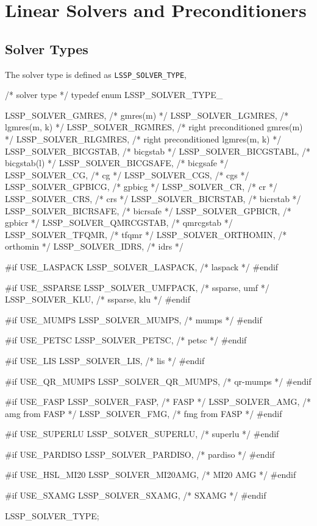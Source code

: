 \chapter{Linear Solvers and Preconditioners}

\section{Solver Types}
The solver type is defined as \verb|LSSP_SOLVER_TYPE|,

\begin{evb}
/* solver type */
typedef enum LSSP_SOLVER_TYPE_
{
    LSSP_SOLVER_GMRES,     /* gmres(m) */
    LSSP_SOLVER_LGMRES,    /* lgmres(m, k) */
    LSSP_SOLVER_RGMRES,    /* right preconditioned gmres(m) */
    LSSP_SOLVER_RLGMRES,   /* right preconditioned lgmres(m, k) */
    LSSP_SOLVER_BICGSTAB,  /* bicgstab */
    LSSP_SOLVER_BICGSTABL, /* bicgstab(l) */
    LSSP_SOLVER_BICGSAFE,  /* bicgsafe */
    LSSP_SOLVER_CG,        /* cg */
    LSSP_SOLVER_CGS,       /* cgs */
    LSSP_SOLVER_GPBICG,    /* gpbicg */
    LSSP_SOLVER_CR,        /* cr */
    LSSP_SOLVER_CRS,       /* crs */
    LSSP_SOLVER_BICRSTAB,  /* bicrstab */
    LSSP_SOLVER_BICRSAFE,  /* bicrsafe */
    LSSP_SOLVER_GPBICR,    /* gpbicr */
    LSSP_SOLVER_QMRCGSTAB, /* qmrcgstab */
    LSSP_SOLVER_TFQMR,     /* tfqmr */
    LSSP_SOLVER_ORTHOMIN,  /* orthomin */
    LSSP_SOLVER_IDRS,      /* idrs */

#if USE_LASPACK
    LSSP_SOLVER_LASPACK,   /* laspack */
#endif

#if USE_SSPARSE
    LSSP_SOLVER_UMFPACK,   /* ssparse, umf */
    LSSP_SOLVER_KLU,       /* ssparse, klu */
#endif

#if USE_MUMPS
    LSSP_SOLVER_MUMPS,     /* mumps */
#endif

#if USE_PETSC
    LSSP_SOLVER_PETSC,     /* petsc */
#endif

#if USE_LIS
    LSSP_SOLVER_LIS,       /* lis */
#endif

#if USE_QR_MUMPS
    LSSP_SOLVER_QR_MUMPS,  /* qr-mumps */
#endif

#if USE_FASP
    LSSP_SOLVER_FASP,      /* FASP */
    LSSP_SOLVER_AMG,       /* amg from FASP */
    LSSP_SOLVER_FMG,       /* fmg from FASP */
#endif

#if USE_SUPERLU
    LSSP_SOLVER_SUPERLU,   /* superlu */
#endif

#if USE_PARDISO
    LSSP_SOLVER_PARDISO,   /* pardiso */
#endif

#if USE_HSL_MI20
    LSSP_SOLVER_MI20AMG,   /* MI20 AMG */
#endif

#if USE_SXAMG
    LSSP_SOLVER_SXAMG,     /* SXAMG */
#endif

} LSSP_SOLVER_TYPE;
\end{evb}

